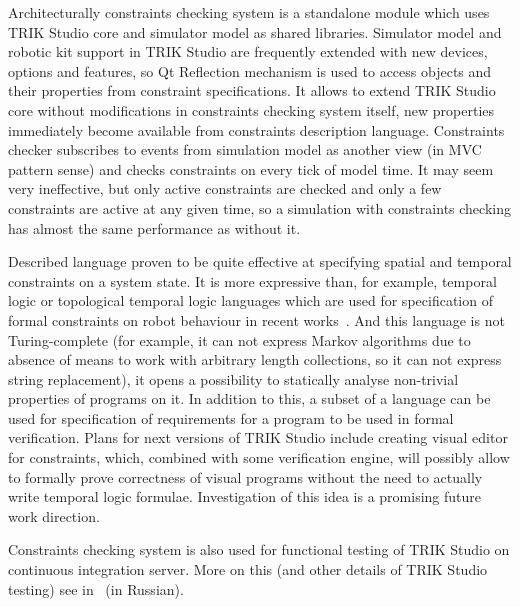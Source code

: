 \documentclass[conference]{IEEEtran}
\begin{document}
{Architecturally constraints checking system is a standalone module which uses TRIK Studio core and simulator model as shared libraries. Simulator model and robotic kit support in TRIK Studio are frequently extended with new devices, options and features, so Qt Reflection mechanism is used to access objects and their properties from constraint specifications. It allows to extend TRIK Studio core without modifications in constraints checking system itself, new properties immediately become available from constraints description language. Constraints checker subscribes to events from simulation model as another view (in MVC pattern sense) and checks constraints on every tick of model time. It may seem very ineffective, but only active constraints are checked and only a few constraints are active at any given time, so a simulation with constraints checking has almost the same performance as without it.

Described language proven to be quite effective at specifying spatial and temporal constraints on a system state. It is more expressive than, for example, temporal logic or topological temporal logic languages which are used for specification of formal constraints on robot behaviour in recent works~\cite{mordvinov2016formal,kress2007s,бугайченко2007разработка,дмитриев2013адаптация}. And this language is not Turing-complete (for example, it can not express Markov algorithms due to absence of means to work with arbitrary length collections, so it can not express string replacement), it opens a possibility to statically analyse non-trivial properties of programs on it. In addition to this, a subset of a language can be used for specification of requirements for a program to be used in formal verification. Plans for next versions of TRIK Studio include creating visual editor for constraints, which, combined with some verification engine, will possibly allow to formally prove correctness of visual programs without the need to actually write temporal logic formulae. Investigation of this idea is a promising future work direction.

Constraints checking system is also used for functional testing of TRIK Studio on continuous integration server. More on this (and other details of TRIK Studio testing) see in~\cite{mordvinov2016testing} (in Russian).

}
\end{document}

